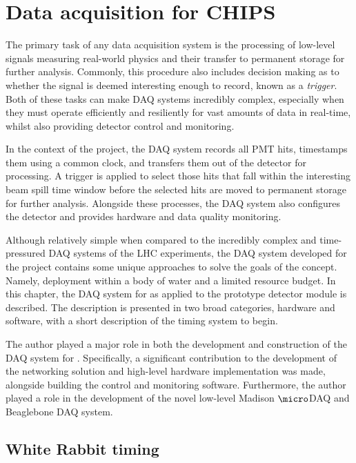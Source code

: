 \chapter{Data acquisition for CHIPS} %
\label{chap:daq} %

The primary task of any data acquisition system is the processing of low-level signals measuring
real-world physics and their transfer to permanent storage for further analysis. Commonly, this
procedure also includes decision making as to whether the signal is deemed interesting enough to
record, known as a \emph{trigger}. Both of these tasks can make DAQ systems incredibly complex,
especially when they must operate efficiently and resiliently for vast amounts of data in
real-time, whilst also providing detector control and monitoring.

In the context of the \chips project, the DAQ system records all PMT hits, timestamps them using a
common clock, and transfers them out of the detector for processing. A trigger is applied to
select those hits that fall within the interesting \numi beam spill time window before the
selected hits are moved to permanent storage for further analysis. Alongside these processes, the
DAQ system also configures the detector and provides hardware and data quality monitoring.

Although relatively simple when compared to the incredibly complex and time-pressured DAQ systems
of the LHC experiments, the DAQ system developed for the \chips project contains some unique
approaches to solve the goals of the \chips concept. Namely, deployment within a body of water and
a limited resource budget. In this chapter, the DAQ system for \chips as applied to the \chipsfive
prototype detector module is described. The description is presented in two broad categories,
hardware and software, with a short description of the timing system to begin.

The author played a major role in both the development and construction of the DAQ system for
\chipsfive. Specifically, a significant contribution to the development of the networking solution
and high-level hardware implementation was made, alongside building the control and monitoring
software. Furthermore, the author played a role in the development of the novel low-level Madison
$\micro$DAQ and Beaglebone DAQ system.

\section{White Rabbit timing} %
\label{sec:daq_timing} %


